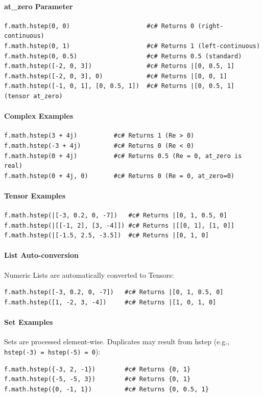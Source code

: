 \paragraph{at\_zero Parameter}
\begin{verbatim}
f.math.hstep(0, 0)                     #c# Returns 0 (right-continuous)
f.math.hstep(0, 1)                     #c# Returns 1 (left-continuous)
f.math.hstep(0, 0.5)                   #c# Returns 0.5 (standard)
f.math.hstep([-2, 0, 3])               #c# Returns |[0, 0.5, 1]
f.math.hstep([-2, 0, 3], 0)            #c# Returns |[0, 0, 1]
f.math.hstep([-1, 0, 1], [0, 0.5, 1])  #c# Returns |[0, 0.5, 1] (tensor at_zero)
\end{verbatim}

\paragraph{Complex Examples}
\begin{verbatim}
f.math.hstep(3 + 4j)          #c# Returns 1 (Re > 0)
f.math.hstep(-3 + 4j)         #c# Returns 0 (Re < 0)
f.math.hstep(0 + 4j)          #c# Returns 0.5 (Re = 0, at_zero is real)
f.math.hstep(0 + 4j, 0)       #c# Returns 0 (Re = 0, at_zero=0)
\end{verbatim}

\paragraph{Tensor Examples}
\begin{verbatim}
f.math.hstep(|[-3, 0.2, 0, -7])   #c# Returns |[0, 1, 0.5, 0]
f.math.hstep(|[[-1, 2], [3, -4]]) #c# Returns |[[0, 1], [1, 0]]
f.math.hstep(|[-1.5, 2.5, -3.5])  #c# Returns |[0, 1, 0]
\end{verbatim}

\paragraph{List Auto-conversion}
Numeric Lists are automatically converted to Tensors:
\begin{verbatim}
f.math.hstep([-3, 0.2, 0, -7])   #c# Returns |[0, 1, 0.5, 0]
f.math.hstep([1, -2, 3, -4])     #c# Returns |[1, 0, 1, 0]
\end{verbatim}

\paragraph{Set Examples}
Sets are processed element-wise. Duplicates may result from hstep (e.g., \texttt{hstep(-3) = hstep(-5) = 0}):
\begin{verbatim}
f.math.hstep({-3, 2, -1})        #c# Returns {0, 1}
f.math.hstep({-5, -5, 3})        #c# Returns {0, 1}
f.math.hstep({0, -1, 1})         #c# Returns {0, 0.5, 1}
\end{verbatim}

